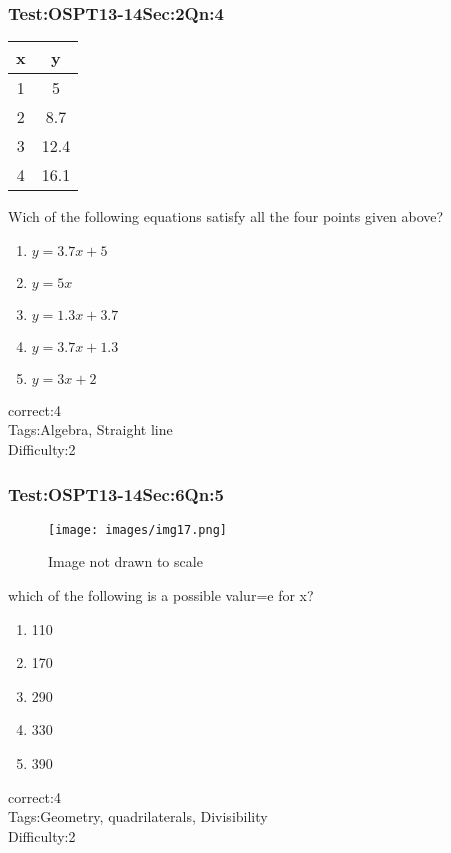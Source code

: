 \documentclass[]{beamer}
\begin{document}
    \begin{frame}
	    \frametitle{Test:OSPT13-14\hspace{2mm}Sec:2\hspace{2mm}Qn:4}
		\begin{center}			    
		    \begin{tabular}{|c|c|}
			    \hline
			    x &y\\
			    \hline
			    1 & 5\\
			    2 & 8.7\\
			    3 & 12.4\\
			    4 & 16.1\\
			    \hline
		    \end{tabular}
		\end{center}
		Wich of the following equations satisfy all the four points given above?
	   \begin{enumerate}
	        \item
	       	$y=3.7x+5$    
	        \item
	            $y=5x$
	        \item
	            $y=1.3x+3.7$
	        \item
	           $y=3.7x+1.3$
	        \item
	           $y=3x+2$
	    \end{enumerate}
	    correct:4\\   
	    Tags:Algebra, Straight line \\
	    Difficulty:2   \\
    \end{frame}    
    \begin{frame}
	    \frametitle{Test:OSPT13-14\hspace{2mm}Sec:6\hspace{2mm}Qn:5}
	    \begin{figure}
	    \begin{center}
	    \texttt{[image: images/img17.png]}
	    \end{center}
	    {Image not drawn to scale}
	    \end{figure}
	    which of the following is a possible valur=e for x?
	   \begin{enumerate}
	        \item
	           110
	        \item
	            170
	        \item
	           290
	        \item
	            330
	        \item
	           390
	    \end{enumerate}
	    correct:4\\   
	    Tags:Geometry, quadrilaterals, Divisibility  \\
	    Difficulty:2   \\
    \end{frame}    
\end{document}
